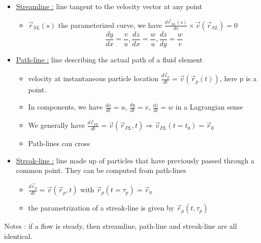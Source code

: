 \documentclass[../main.tex]{subfiles}
\begin{document}
\begin{itemize}
    \item \underline{Streamline :} line tangent to the velocity vector at any point\begin{itemize}
        \item $\Vec{r}_{SL}(s)$ the parameterized curve, we have $\frac{d\Vec{r}_{SL}(s)}{ds}\times \Vec{v}(\Vec{r}_{SL}) = 0$\\
        \begin{equation}
            \frac{dy}{dx} = \frac{v}{u}, \frac{dz}{dx} = \frac{w}{u}, \frac{dz}{dy} = \frac{w}{v}
        \end{equation}
    \end{itemize}
    \item \underline{Path-line :} line describing the actual path of a fluid element \begin{itemize}
        \item velocity at instantaneous particle location $\frac{d\Vec{r}_p}{dt} = \Vec{v}(\Vec{r}_p(t))$, here p is a point. \\
        \item In components, we have $\frac{dx}{dt} = u$, $\frac{dy}{dt} = v$, $\frac{dz}{dt} = w$ in a Lagrangian sense\\
        \item We generally have $\frac{d\Vec{r}_{PL}}{dt} = \Vec{v}(\Vec{r}_{PL},t) \Rightarrow \Vec{v}_{PL}(t=t_0) = \Vec{r}_0$\\
        \item \warning Path-lines can cross\\
    \end{itemize}
    \item \underline{Streak-line :} line made up of particles that have previously passed through a common point. They can be computed from path-lines \begin{itemize}
        \item $\frac{d\Vec{r}_p}{dt} = \Vec{v}(\Vec{r}_p,t)$ with $\Vec{r}_p(t=\tau_p)= \Vec{r}_0$\\
        \item the parametrization of a streak-line is given by $\Vec{r}_p(t,\tau_p)$\\ 
    \end{itemize}
\end{itemize}

\color{gray}Notes : if a flow is steady, then streamline, path-line and streak-line are all identical.\color{black}\\
\end{document}
